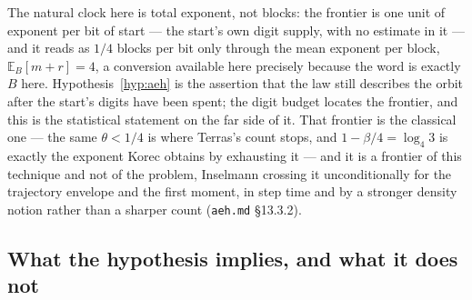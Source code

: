 \documentclass[11pt]{article}
\theoremstyle{remark}
\begin{document}
The natural clock here is total exponent, not blocks: the frontier is one unit of
exponent per bit of start --- the start's own digit supply, with no estimate in it
--- and it reads as $1/4$ blocks per bit only through the mean exponent per block,
$\mathbb{E}_B[m+r] = 4$, a conversion available here precisely because the word is
exactly $B$ here. Hypothesis~\ref{hyp:aeh} is the assertion that the law still
describes the orbit after the start's digits have been spent; the digit budget
locates the frontier, and this is the statistical statement on the far side of it.
That frontier is the classical one --- the same $\theta < 1/4$ is where Terras's
count stops, and $1 - \beta/4 = \log_4 3$ is exactly the exponent Korec
\cite{korec} obtains by exhausting it --- and it is a frontier of this technique
and not of the problem, Inselmann \cite{inselmann} crossing it unconditionally for
the trajectory envelope and the first moment, in step time and by a stronger
density notion rather than a sharper count (\texttt{aeh.md} \S13.3.2).

\subsection*{What the hypothesis implies, and what it does not}
\end{document}
